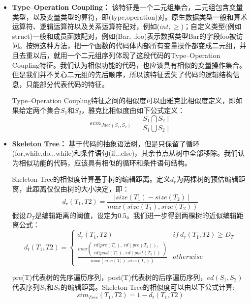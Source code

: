 \begin{itemize}
	\item \textbf{Type–Operation Coupling：} 该特征是一个二元组集合，二元组包含变量类型，以及变量类型的算符，即(type,operation)对。原生数据类型一般和算术运算符、逻辑运算符以及关系运算符配对，例如($int, \geq$)；自定义类型(例如struct)一般和成员函数配对，例如(Bar, .foo)表示数据类型Bar的字段foo被访问。按照这种方法，把一个函数的代码体内部所有变量操作都变成二元组，并且去重以后，就用一个二元组序列体现了这段代码的Type–Operation Coupling特征。我们认为相似功能的代码，也应该具有相似的变量操作集合。但是我们并不关心二元组的先后顺序，所以该特征丢失了代码的逻辑结构信息，只能部分代表代码的特征。
	
	Type–Operation Coupling特征之间的相似度可以由雅克比相似度定义，即如果给定两个集合$S_{1}$和$S_{2}$，雅克比相似度由如下公式定义：
	\begin{equation}
	sim_{Jacc(S_{1},S_{2})}=\frac{\mid S_{1}\bigcap S_{2}\mid}{\mid S_{1}\bigcup S_{2}\mid}
	\end{equation}
	
	\item \textbf{Skeleton Tree：} 基于代码的抽象语法树，但是只保留了循环(for,while,do...while)和条件语句(if...else)，其余节点从树中全部移除。我们认为相似功能的代码，应该具有相似的循环和条件语句结构。
	
	Skeleton Tree的相似度计算基于树的编辑距离。定义$d_{r}$为两棵树的预估编辑距离，此距离仅仅由树的大小决定，即：
	\begin{equation}
	d_{r}(T_{1},T{2})=\frac{\mid size(T_{1})-size(T_{2})\mid}{max(size(T_{1}),size(T_{2}))}
	\end{equation}
	假设$D_{T}$是编辑距离的阈值，设定为0.5。我们进一步得到两棵树的近似编辑距离公式：
	\begin{equation}
	d_{t}(T_{1},T{2})=\begin{cases}d_{r}(T_{1},T{2}) & if~d_{r}(T_{1},T{2})\geq D_{T}\\\frac{max\left(\begin{array}{c}ed(pre(T_{1}),~ed(pre(T_{2})),\\ ed(post(T_{1}),~ed(post(T_{2}))\end{array}\right)}{max(size(T_{1}),size(T_{2}))} & otherwise\end{cases}
	\end{equation}
	
	pre(T)代表树的先序遍历序列，post(T)代表树的后序遍历序列，$ed(S_{1},S_{2})$代表序列$S_{1}$和$S_{2}$的编辑距离。Skeleton Tree的相似度可以由以下公式计算:
	\begin{equation}
	sim_{Tree}(T_{1},T{2})=1-d_{t}(T_{1},T{2})
	\end{equation}
	

\end{itemize}

